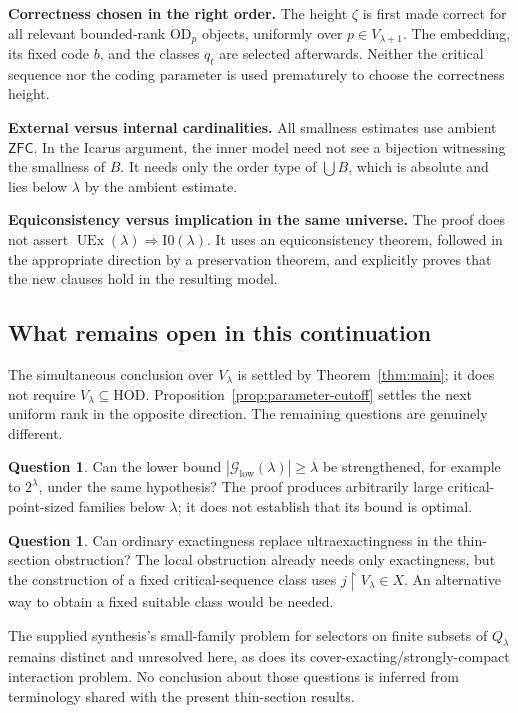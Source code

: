 \documentclass[11pt,letterpaper]{article}
\theoremstyle{definition}
\newcommand{\ZFC}{\mathsf{ZFC}}
\newcommand{\HOD}{\mathrm{HOD}}
\newcommand{\OD}{\mathrm{OD}}
\newcommand{\UEx}{\operatorname{UEx}}
\newcommand{\restr}{\mathbin{\upharpoonright}}
\newcommand{\Izero}{\mathrm{I0}}
\newtheorem{question}[definition]{Question}
\numberwithin{equation}{section}
\newcommand{\Good}{\mathcal G}
\begin{document}
\textbf{Correctness chosen in the right order.}
The height $\zeta$ is first made correct for all relevant bounded-rank
$\OD_p$ objects, uniformly over $p\in V_{\lambda+1}$. The embedding, its
fixed code $b$, and the classes $q_t$ are selected afterwards. Neither the
critical sequence nor the coding parameter is used prematurely to choose
the correctness height.

\textbf{External versus internal cardinalities.}
All smallness estimates use ambient $\ZFC$. In the Icarus argument, the
inner model need not see a bijection witnessing the smallness of $B$.
It needs only the order type of $\bigcup B$, which is absolute and lies
below $\lambda$ by the ambient estimate.

\textbf{Equiconsistency versus implication in the same universe.}
The proof does not assert $\UEx(\lambda)\Rightarrow\Izero(\lambda)$.
It uses an equiconsistency theorem, followed in the appropriate direction by
a preservation theorem, and explicitly proves that the new clauses hold in
the resulting model.

\subsection{What remains open in this continuation}

The simultaneous conclusion over $V_\lambda$ is settled by
Theorem~\ref{thm:main}; it does not require $V_\lambda\subseteq\HOD$.
Proposition~\ref{prop:parameter-cutoff} settles the next uniform rank in the
opposite direction. The remaining questions are genuinely different.

\begin{question}
Can the lower bound $|\Good_{\mathrm{low}}(\lambda)|\ge\lambda$ be strengthened, for
example to $2^\lambda$, under the same hypothesis? The proof produces
arbitrarily large critical-point-sized families below $\lambda$; it does not
establish that its bound is optimal.
\end{question}

\begin{question}
Can ordinary exactingness replace ultraexactingness in the thin-section
obstruction? The local obstruction already needs only exactingness, but the
construction of a fixed critical-sequence class uses
$j\restr V_\lambda\in X$. An alternative way to obtain a fixed suitable
class would be needed.
\end{question}

The supplied synthesis's small-family problem for selectors on finite
subsets of $Q_\lambda$ remains distinct and unresolved here, as does its
cover-exacting/strongly-compact interaction problem. No conclusion about
those questions is inferred from terminology shared with the present
thin-section results.
\end{document}
